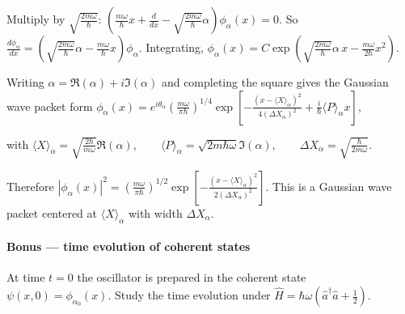 \documentclass[11pt,a4paper]{scrartcl}
\begin{document}
\begin{enumerate}[label=(\alph*)]
\begin{calculationbox}
    Multiply by $\sqrt{\frac{2m\omega}{\hbar}}$:
    $
    \left(
    \frac{m\omega}{\hbar}x + \frac{d}{dx}
    - \sqrt{\frac{2m\omega}{\hbar}}\alpha
    \right)\phi_\alpha(x)=0.
    $
    So
    $
    \frac{d\phi_\alpha}{dx}
    =
    \left(
    \sqrt{\frac{2m\omega}{\hbar}}\alpha
    -\frac{m\omega}{\hbar}x
    \right)\phi_\alpha.
    $
    Integrating,
    $
    \phi_\alpha(x)=C
    \exp\!\left(
    \sqrt{\frac{2m\omega}{\hbar}}\alpha\,x
    -\frac{m\omega}{2\hbar}x^2
    \right).
    $

    Writing $\alpha=\Re(\alpha)+i\Im(\alpha)$ and completing the square gives the Gaussian wave packet form
    $
    \phi_\alpha(x)
    =
    e^{i\theta_\alpha}
    \left(\frac{m\omega}{\pi\hbar}\right)^{1/4}
    \exp\!\left[
    -\frac{(x-\langle X\rangle_\alpha)^2}{4(\Delta X_\alpha)^2}
    + \frac{i}{\hbar}\langle P\rangle_\alpha x
    \right],
    $

    with
    $
    \langle X\rangle_\alpha=\sqrt{\frac{2\hbar}{m\omega}}\Re(\alpha),
    \qquad
    \langle P\rangle_\alpha=\sqrt{2m\hbar\omega}\Im(\alpha),
    \qquad
    \Delta X_\alpha=\sqrt{\frac{\hbar}{2m\omega}}.
    $

    Therefore
    $
    |\phi_\alpha(x)|^2
    =
    \left(\frac{m\omega}{\pi\hbar}\right)^{1/2}
    \exp\!\left[
    -\frac{(x-\langle X\rangle_\alpha)^2}{2(\Delta X_\alpha)^2}
    \right].
    $
    This is a Gaussian wave packet centered at $\langle X\rangle_\alpha$ with width $\Delta X_\alpha$.
    \end{calculationbox}
\end{enumerate}

\paragraph{Bonus --- time evolution of coherent states}

At time $t=0$ the oscillator is prepared in the coherent state
$
\psi(x,0)=\phi_{\alpha_0}(x).
$
Study the time evolution under
$
\hat H=\hbar\omega\left(\hat a^\dagger\hat a+\frac12\right).
$
\end{document}
